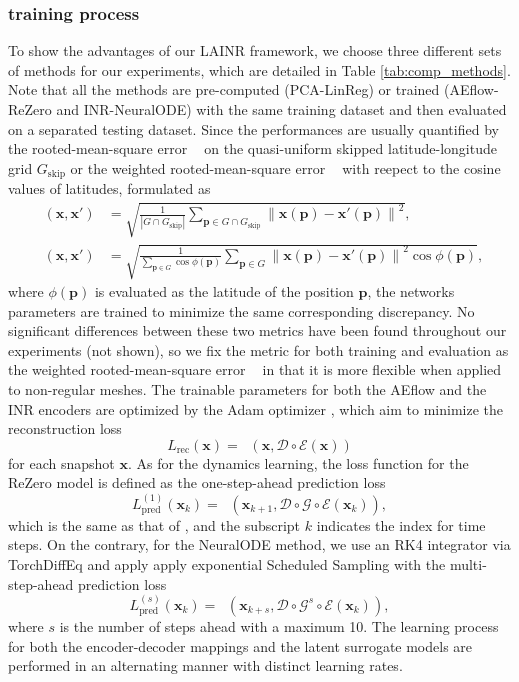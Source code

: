 \documentclass{article}
\newcommand{\mE}{\mathcal{E}}
\newcommand{\mD}{\mathcal{D}}
\newcommand{\mG}{\mathcal{G}}
\DeclareMathOperator{\skiploss}{\mathcal{L}^{\mathrm{skip}}}
\DeclareMathOperator{\weightedloss}{\mathcal{L}^{\mathrm{weighted}}}
\begin{document}
\subsubsection{training process}
To show the advantages of our LAINR framework, we choose three different sets of methods for our experiments, which are detailed in Table \ref{tab:comp_methods}. Note that all the methods are pre-computed (PCA-LinReg) or trained (AEflow-ReZero and INR-NeuralODE) with the same training dataset and then evaluated on a separated testing dataset. Since the performances are usually quantified by the rooted-mean-square error $\skiploss$ on the quasi-uniform skipped latitude-longitude grid $G_\mathrm{skip}$ \cite{Weller2012SkipLatLon} or the weighted rooted-mean-square error $\weightedloss$ with reepect to the cosine values of latitudes, formulated as
\begin{align*}
	\skiploss(\bm x,\bm x')     & =\sqrt{\frac{1}{|G\cap G_{\mathrm{skip}}|}\sum_{\bm p\in G\cap G_{\mathrm{skip}}}\left\|\bm x(\bm p)-\bm x'(\bm p)\right\|^2}, \\
	\weightedloss(\bm x,\bm x') & =\sqrt{\frac{1}{\sum_{\bm p\in G}\cos\phi(\bm p)}\sum_{\bm p\in G}\left\|\bm x(\bm p)-\bm x'(\bm p)\right\|^2\cos\phi(\bm p)},
\end{align*}
where $\phi(\bm p)$ is evaluated as the latitude of the position $\bm p$, the networks parameters are trained to minimize the same corresponding discrepancy. No significant differences between these two metrics have been found throughout our experiments (not shown), so we fix the metric for both training and evaluation as the weighted rooted-mean-square error $\weightedloss$ in that it is more flexible when applied to non-regular meshes. The trainable parameters for both the AEflow and the INR encoders are optimized by the Adam optimizer \cite{kingma2014adam}, which aim to minimize the reconstruction loss
\[L_{\textrm{rec}}(\bm x)=\weightedloss(\bm x,\mD\circ\mE(\bm x))\]
for each snapshot $\bm x$. As for the dynamics learning, the loss function for the ReZero model is defined as the one-step-ahead prediction loss
\[L_{\textrm{pred}}^{(1)}(\bm x_k)=\weightedloss(\bm x_{k+1},\mD\circ\mG\circ\mE(\bm x_k)),\]
which is the same as that of \cite{Peyron2021LAwithAE}, and the subscript $k$ indicates the index for time steps. On the contrary, for the NeuralODE method, we use an RK4 integrator via TorchDiffEq \cite{chen2018NeuralODE} and apply apply exponential Scheduled Sampling with the multi-step-ahead prediction loss
\[L_{\textrm{pred}}^{(s)}(\bm x_k)=\weightedloss(\bm x_{k+s},\mD\circ\mG^s\circ\mE(\bm x_k)),\]
where $s$ is the number of steps ahead with a maximum 10. The learning process for both the encoder-decoder mappings and the latent surrogate models are performed in an alternating manner with distinct learning rates.
\end{document}
